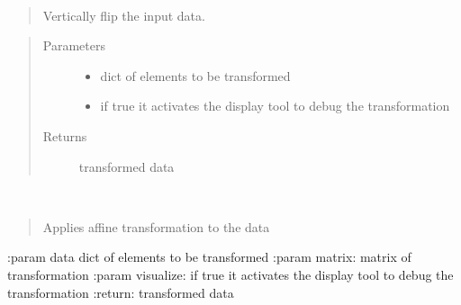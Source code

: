\documentclass[letterpaper,10pt,english]{sphinxmanual}
\begin{document}
\begin{fulllineitems}
\label{\detokenize{ida_lib.operations:ida_lib.operations.transforms.vflip}}~\begin{quote}

Vertically  flip the input data.
\end{quote}
\begin{quote}\begin{description}
\item[{Parameters}] \leavevmode\begin{itemize}
\item {} 
 \textendash{} dict of elements to be transformed

\item {} 
 \textendash{} if true it activates the display tool to debug the transformation

\end{itemize}

\item[{Returns}] \leavevmode
transformed data

\end{description}\end{quote}

\end{fulllineitems}


\begin{fulllineitems}
\label{\detokenize{ida_lib.operations:ida_lib.operations.transforms.affine}}~\begin{quote}

Applies affine transformation to the data
\end{quote}

:param data  dict of elements to be transformed
:param matrix: matrix of transformation
:param visualize: if true it activates the display tool to debug the transformation
:return: transformed data

\end{fulllineitems}
\end{document}
